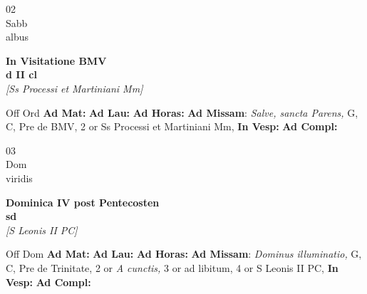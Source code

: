 \documentclass[10pt, openany]{book}
\begin{document}
        \begin{center}
            \begin{minipage}{3.5in}
                \vspace{2em}
                \begin{minipage}{0.5in}
                    {\Huge 02} \\
                    {\normalsize Sabb} \\
                    {\normalsize albus}
                \end{minipage}
                \begin{minipage}{3.0in}
                    \textbf{ \large In Visitatione BMV \\
                    \textnormal{\normalsize d II cl}} \\ \textit{[Ss Processi et Martiniani Mm]} \\ 
                \end{minipage}
                \begin{justify}Off Ord
                    \textbf{Ad Mat: }
                    \textbf{Ad Lau: }
                    \textbf{Ad Horas: }\textbf{Ad Missam}: \textit{Salve, sancta Parens,} G, C, Pre de BMV, 2 or Ss Processi et Martiniani Mm,  
                    \textbf{In Vesp: }
                    \textbf{Ad Compl: }
                \end{justify}
            \end{minipage}
        \end{center}
    
        \begin{center}
            \begin{minipage}{3.5in}
                \vspace{2em}
                \begin{minipage}{0.5in}
                    {\Huge 03} \\
                    {\normalsize Dom} \\
                    {\normalsize viridis}
                \end{minipage}
                \begin{minipage}{3.0in}
                    \textbf{ \large Dominica IV post Pentecosten \\
                    \textnormal{\normalsize sd}} \\ \textit{[S Leonis II PC]} \\ 
                \end{minipage}
                \begin{justify}Off Dom
                    \textbf{Ad Mat: }
                    \textbf{Ad Lau: }
                    \textbf{Ad Horas: }\textbf{Ad Missam}: \textit{Dominus illuminatio,} G, C, Pre de Trinitate, 2 or \textit{A cunctis,} 3 or ad libitum, 4 or S Leonis II PC,  
                    \textbf{In Vesp: }
                    \textbf{Ad Compl: }
                \end{justify}
            \end{minipage}
        \end{center}
    
\end{document}
